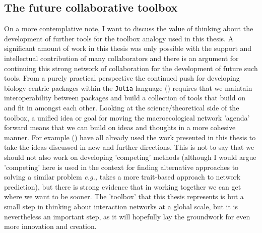 \begin{refsection}
\subsection{The future collaborative toolbox}

On a more contemplative note, I want to discuss the value of thinking about the development of further tools for the toolbox analogy used in this thesis. A significant amount of work in this thesis was only possible with the support and intellectual contribution of many collaborators and there is an argument for continuing this strong network of collaboration for the development of future such tools. From a purely practical perspective the continued push for developing biology-centric packages within the \texttt{Julia} language (\cite{Roesch2021Julia}) requires that we maintain interoperability between packages and build a collection of tools that build on and fit in amongst each other. Looking at the science/theoretical side of the toolbox, a unified idea or goal for moving the macroecological network 'agenda' forward means that we can build on ideas and thoughts in a more cohesive manner. For example (\cite{Dansereau2023Spatially, Catchen2023Improving, Banville2023What}) have all already used the work presented in this thesis to take the ideas discussed in new and further directions. This is not to say that we should not also work on developing 'competing' methods (although I would argue 'competing' here is used in the context for finding alternative approaches to solving a similar problem \emph{e.g.,} \cite{Caron2022Addressing} takes a more trait-based approach to network prediction), but there is strong evidence that in working together we can get where we want to be sooner. The 'toolbox' that this thesis represents is but a small step in thinking about interaction networks at a global scale, but it is nevertheless an important step, as it will hopefully lay the groundwork for even more innovation and creation.

\printbibliography
\end{refsection}

\endinput